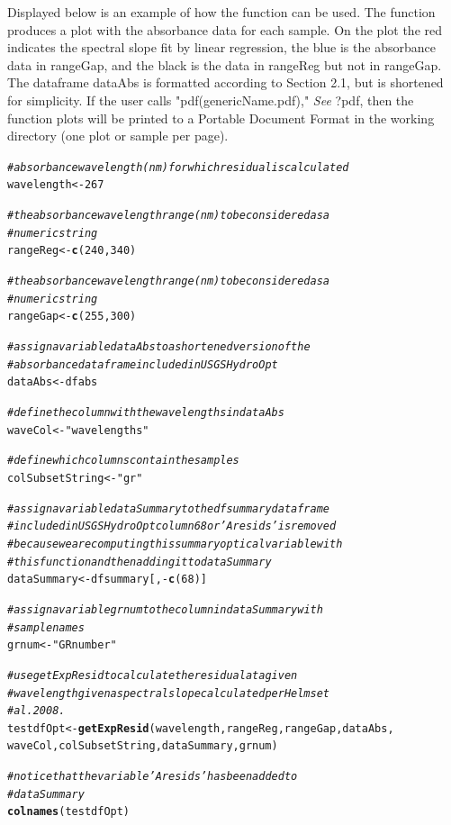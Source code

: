 \documentclass[a4paper,11pt]{article}\usepackage[]{graphicx}\usepackage[]{color}
\makeatletter
\newcommand{\hlnum}[1]{\textcolor[rgb]{0.686,0.059,0.569}{#1}}%
\newcommand{\hlstr}[1]{\textcolor[rgb]{0.192,0.494,0.8}{#1}}%
\newcommand{\hlcom}[1]{\textcolor[rgb]{0.678,0.584,0.686}{\textit{#1}}}%
\newcommand{\hlopt}[1]{\textcolor[rgb]{0,0,0}{#1}}%
\newcommand{\hlstd}[1]{\textcolor[rgb]{0.345,0.345,0.345}{#1}}%
\newcommand{\hlkwb}[1]{\textcolor[rgb]{0.69,0.353,0.396}{#1}}%
\newcommand{\hlkwd}[1]{\textcolor[rgb]{0.737,0.353,0.396}{\textbf{#1}}}%
\newenvironment{kframe}{%
 \def\at@end@of@kframe{}%
 \ifinner\ifhmode%
  \def\at@end@of@kframe{\end{minipage}}%
  \begin{minipage}{\columnwidth}%
 \fi\fi%
 \def\FrameCommand##1{\hskip\@totalleftmargin \hskip-\fboxsep
 \colorbox{shadecolor}{##1}\hskip-\fboxsep
     \hskip-\linewidth \hskip-\@totalleftmargin \hskip\columnwidth}%
 \MakeFramed {\advance\hsize-\width
   \@totalleftmargin\z@ \linewidth\hsize
   \@setminipage}}%
 {\par\unskip\endMakeFramed%
 \at@end@of@kframe}
\newenvironment{knitrout}{}{} %
\makeatother
\begin{document}
Displayed below is an example of how the function can be used. The function produces a plot with the absorbance data for each sample. On the plot the red indicates the spectral slope fit by linear regression, the blue is the absorbance data in rangeGap, and the black is the data in rangeReg but not in rangeGap. The dataframe dataAbs is formatted according to Section 2.1, but is shortened for simplicity. If the user calls "pdf(genericName.pdf)," \emph{See }?pdf, then the function plots will be printed to a Portable Document Format in the working directory (one plot or sample per page). 

\begin{knitrout}
\color{fgcolor}\begin{kframe}
\begin{alltt}
\hlcom{# absorbance wavelength (nm) for which residual is calculated}
\hlstd{wavelength} \hlkwb{<-} \hlnum{267}

\hlcom{# the absorbance wavelength range (nm) to be considered as a}
\hlcom{# numeric string}
\hlstd{rangeReg} \hlkwb{<-} \hlkwd{c}\hlstd{(}\hlnum{240}\hlstd{,} \hlnum{340}\hlstd{)}

\hlcom{# the absorbance wavelength range (nm) to be considered as a}
\hlcom{# numeric string}
\hlstd{rangeGap} \hlkwb{<-} \hlkwd{c}\hlstd{(}\hlnum{255}\hlstd{,} \hlnum{300}\hlstd{)}

\hlcom{# assign a variable dataAbs to a shortened version of the}
\hlcom{# absorbance dataframe included in USGSHydroOpt}
\hlstd{dataAbs} \hlkwb{<-} \hlstd{dfabs}

\hlcom{# define the column with the wavelengths in dataAbs}
\hlstd{waveCol} \hlkwb{<-} \hlstr{"wavelengths"}

\hlcom{# define which columns contain the samples}
\hlstd{colSubsetString} \hlkwb{<-} \hlstr{"gr"}

\hlcom{# assign a variable dataSummary to the dfsummary dataframe}
\hlcom{# included in USGSHydroOpt column 68 or 'Aresids' is removed}
\hlcom{# because we are computing this summary optical variable with}
\hlcom{# this function and then adding it to dataSummary}
\hlstd{dataSummary} \hlkwb{<-} \hlstd{dfsummary[,} \hlopt{-}\hlkwd{c}\hlstd{(}\hlnum{68}\hlstd{)]}

\hlcom{# assign a variable grnum to the column in dataSummary with}
\hlcom{# sample names}
\hlstd{grnum} \hlkwb{<-} \hlstr{"GRnumber"}

\hlcom{# use getExpResid to calculate the residual at a given}
\hlcom{# wavelength given a spectral slope calculated per Helms et}
\hlcom{# al. 2008.}
\hlstd{testdfOpt} \hlkwb{<-} \hlkwd{getExpResid}\hlstd{(wavelength, rangeReg, rangeGap, dataAbs,}
    \hlstd{waveCol, colSubsetString, dataSummary, grnum)}

\hlcom{# notice that the variable 'Aresids' has been added to}
\hlcom{# dataSummary}
\hlkwd{colnames}\hlstd{(testdfOpt)}
\end{alltt}
\end{kframe}
\end{knitrout}
\end{document}
